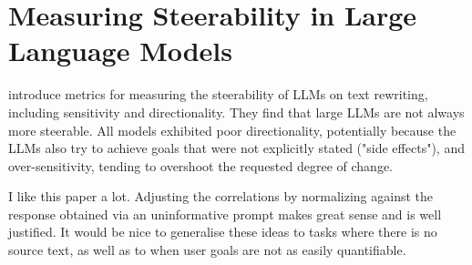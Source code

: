 \section{Measuring Steerability in Large Language Models}

\textcite{chang2024MeasuringSteerabilityLarge} introduce metrics for measuring the steerability of LLMs on text rewriting, including sensitivity and directionality. They find that large LLMs are not always more steerable. All models exhibited poor directionality, potentially because the LLMs also try to achieve goals that were not explicitly stated ("side effects"), and over-sensitivity, tending to overshoot the requested degree of change. 

I like this paper a lot. Adjusting the correlations by normalizing against the response obtained via an uninformative prompt makes great sense and is well justified. It would be nice to generalise these ideas to tasks where there is no source text, as well as to when user goals are not as easily quantifiable.